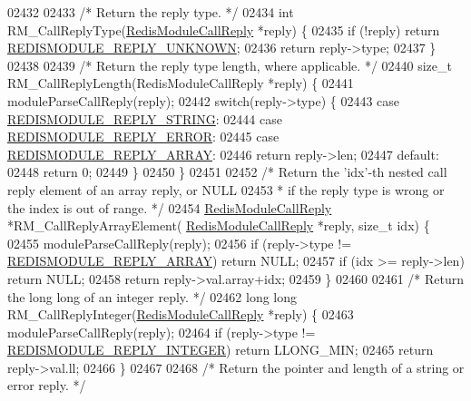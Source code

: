 \begin{DoxyCode}
{{{02432 
02433 \textcolor{comment}{/* Return the reply type. */}
02434 \textcolor{keywordtype}{int} RM\_CallReplyType(\hyperlink{structRedisModuleCallReply}{RedisModuleCallReply} *reply) \{
02435     \textcolor{keywordflow}{if} (!reply) \textcolor{keywordflow}{return} \hyperlink{redismodule_8h_a60cb302d85b881ad4a0c27db04688f94}{REDISMODULE\_REPLY\_UNKNOWN};
02436     \textcolor{keywordflow}{return} reply->type;
02437 \}
02438 
02439 \textcolor{comment}{/* Return the reply type length, where applicable. */}
02440 size\_t RM\_CallReplyLength(RedisModuleCallReply *reply) \{
02441     moduleParseCallReply(reply);
02442     \textcolor{keywordflow}{switch}(reply->type) \{
02443     \textcolor{keywordflow}{case} \hyperlink{redismodule_8h_abc8a4584f9085b55692994244a26012b}{REDISMODULE\_REPLY\_STRING}:
02444     \textcolor{keywordflow}{case} \hyperlink{redismodule_8h_ae70c78e91f22b2ff98795babccac44c9}{REDISMODULE\_REPLY\_ERROR}:
02445     \textcolor{keywordflow}{case} \hyperlink{redismodule_8h_a2adb9d56c9d950784c3397cbe3f5d6af}{REDISMODULE\_REPLY\_ARRAY}:
02446         \textcolor{keywordflow}{return} reply->len;
02447     \textcolor{keywordflow}{default}:
02448         \textcolor{keywordflow}{return} 0;
02449     \}
02450 \}
02451 
02452 \textcolor{comment}{/* Return the 'idx'-th nested call reply element of an array reply, or NULL}
02453 \textcolor{comment}{ * if the reply type is wrong or the index is out of range. */}
02454 \hyperlink{structRedisModuleCallReply}{RedisModuleCallReply} *RM\_CallReplyArrayElement(
      \hyperlink{structRedisModuleCallReply}{RedisModuleCallReply} *reply, size\_t idx) \{
02455     moduleParseCallReply(reply);
02456     \textcolor{keywordflow}{if} (reply->type != \hyperlink{redismodule_8h_a2adb9d56c9d950784c3397cbe3f5d6af}{REDISMODULE\_REPLY\_ARRAY}) \textcolor{keywordflow}{return} NULL;
02457     \textcolor{keywordflow}{if} (idx >= reply->len) \textcolor{keywordflow}{return} NULL;
02458     \textcolor{keywordflow}{return} reply->val.array+idx;
02459 \}
02460 
02461 \textcolor{comment}{/* Return the long long of an integer reply. */}
02462 \textcolor{keywordtype}{long} \textcolor{keywordtype}{long} RM\_CallReplyInteger(\hyperlink{structRedisModuleCallReply}{RedisModuleCallReply} *reply) \{
02463     moduleParseCallReply(reply);
02464     \textcolor{keywordflow}{if} (reply->type != \hyperlink{redismodule_8h_a9cff1d7e4fdc52b273949ed0d83e916b}{REDISMODULE\_REPLY\_INTEGER}) \textcolor{keywordflow}{return} LLONG\_MIN;
02465     \textcolor{keywordflow}{return} reply->val.ll;
02466 \}
02467 
02468 \textcolor{comment}{/* Return the pointer and length of a string or error reply. */}
}}}
\end{DoxyCode}

